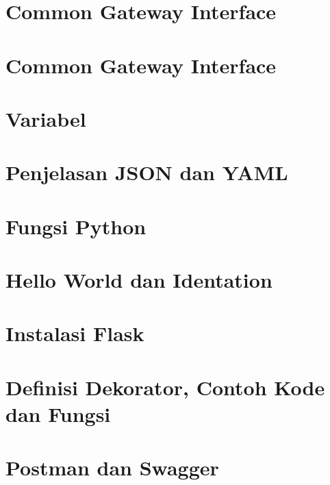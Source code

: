 \documentclass{wileySix}
\begin{document}
\chapter[Pemanggilan Modul]
{Common Gateway Interface}


\chapter[Instalasi PIP]
{Common Gateway Interface}


\chapter[Variabel]
{Variabel}


\chapter[Penjelasan JSON dan YAML]
{Penjelasan JSON dan YAML}


\chapter[Fungsi Python]
{Fungsi Python}


\chapter[Hello World Python dan Identation]
{Hello World dan Identation}





\chapter[Instalasi Flask]
{Instalasi Flask}


\chapter[Definisi Dekorator, Contoh Kode dan Fungsi]
{Definisi Dekorator, Contoh Kode dan Fungsi}


\chapter[Postman dan Swagger]
{Postman dan Swagger}

\end{document}
